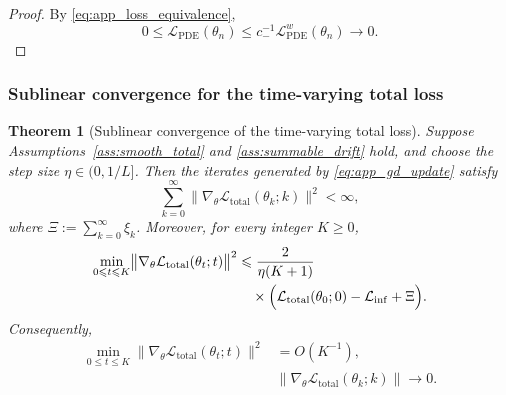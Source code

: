 \documentclass{article}
\theoremstyle{plain}
\newtheorem{theorem}{Theorem}[section]
\theoremstyle{definition}
\theoremstyle{remark}
\begin{document}
\begin{proof}
	By \eqref{eq:app_loss_equivalence},
	\begin{equation}
		0
		\leqslant
		\mathcal{L}_{\mathrm{PDE}}(\theta_n)
		\leqslant
		c_-^{-1}\mathcal{L}_{\mathrm{PDE}}^{w}(\theta_n)\to 0.
		\label{eq:app_loss_consistency_proof}
	\end{equation}
\end{proof}

\subsubsection{Sublinear convergence for the time-varying total loss}

\begin{theorem}[Sublinear convergence of the time-varying total loss]
	\label{thm:nonconvex_convergence}
	Suppose Assumptions~\ref{ass:smooth_total} and
	\ref{ass:summable_drift} hold, and choose the step size
	$\eta\in(0,1/L]$.
	Then the iterates generated by \eqref{eq:app_gd_update} satisfy
	\begin{equation}
		\sum_{k=0}^{\infty}
		\bigl\|
		\nabla_{\theta}\mathcal{L}_{\mathrm{total}}(\theta_k;k)
		\bigr\|^2
		<\infty,
		\label{eq:app_grad_square_sum}
	\end{equation}
	where $\Xi:=\sum_{k=0}^{\infty}\xi_k$.
	Moreover, for every integer $K\geqslant 0$,
	\begin{equation}
		\begin{split}
			\min_{0\leqslant t\leqslant K}
			\bigl\|
			\nabla_{\theta}\mathcal{L}_{\mathrm{total}}(\theta_t;t)
			\bigr\|^2
			&\leqslant
			\frac{2}{\eta(K+1)} \\
			&\quad \times
			\Bigl(
			\mathcal{L}_{\mathrm{total}}(\theta_0;0)-\mathcal{L}_{\inf}+\Xi
			\Bigr).
		\end{split}
		\label{eq:app_sublinear_rate}
	\end{equation}
	Consequently,
	\begin{equation}
		\begin{aligned}
			\min_{0\leqslant t\leqslant K}
			\bigl\|
			\nabla_{\theta}\mathcal{L}_{\mathrm{total}}(\theta_t;t)
			\bigr\|^2
			& =
			O(K^{-1}),\\
			& \bigl\|
			\nabla_{\theta}\mathcal{L}_{\mathrm{total}}(\theta_k;k)
			\bigr\|\to 0.
			\label{eq:app_grad_vanish}
		\end{aligned}
	\end{equation}
\end{theorem}
\end{document}
